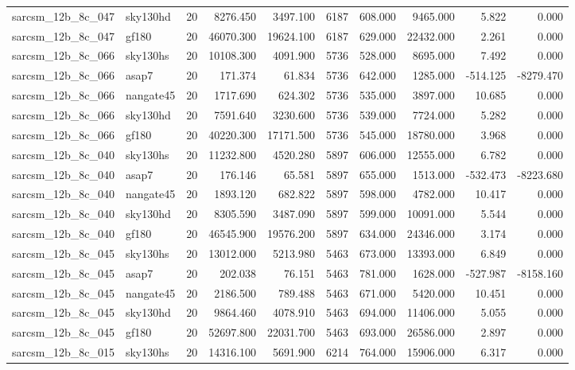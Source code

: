 \begin{longtable}{llrrrrrrrr}
sarcsm\_12b\_8c\_047 & sky130hd & 20 & 8276.450 & 3497.100 & 6187 & 608.000 & 9465.000 & 5.822 & 0.000 \\
sarcsm\_12b\_8c\_047 & gf180 & 20 & 46070.300 & 19624.100 & 6187 & 629.000 & 22432.000 & 2.261 & 0.000 \\
sarcsm\_12b\_8c\_066 & sky130hs & 20 & 10108.300 & 4091.900 & 5736 & 528.000 & 8695.000 & 7.492 & 0.000 \\
sarcsm\_12b\_8c\_066 & asap7 & 20 & 171.374 & 61.834 & 5736 & 642.000 & 1285.000 & -514.125 & -8279.470 \\
sarcsm\_12b\_8c\_066 & nangate45 & 20 & 1717.690 & 624.302 & 5736 & 535.000 & 3897.000 & 10.685 & 0.000 \\
sarcsm\_12b\_8c\_066 & sky130hd & 20 & 7591.640 & 3230.600 & 5736 & 539.000 & 7724.000 & 5.282 & 0.000 \\
sarcsm\_12b\_8c\_066 & gf180 & 20 & 40220.300 & 17171.500 & 5736 & 545.000 & 18780.000 & 3.968 & 0.000 \\
sarcsm\_12b\_8c\_040 & sky130hs & 20 & 11232.800 & 4520.280 & 5897 & 606.000 & 12555.000 & 6.782 & 0.000 \\
sarcsm\_12b\_8c\_040 & asap7 & 20 & 176.146 & 65.581 & 5897 & 655.000 & 1513.000 & -532.473 & -8223.680 \\
sarcsm\_12b\_8c\_040 & nangate45 & 20 & 1893.120 & 682.822 & 5897 & 598.000 & 4782.000 & 10.417 & 0.000 \\
sarcsm\_12b\_8c\_040 & sky130hd & 20 & 8305.590 & 3487.090 & 5897 & 599.000 & 10091.000 & 5.544 & 0.000 \\
sarcsm\_12b\_8c\_040 & gf180 & 20 & 46545.900 & 19576.200 & 5897 & 634.000 & 24346.000 & 3.174 & 0.000 \\
sarcsm\_12b\_8c\_045 & sky130hs & 20 & 13012.000 & 5213.980 & 5463 & 673.000 & 13393.000 & 6.849 & 0.000 \\
sarcsm\_12b\_8c\_045 & asap7 & 20 & 202.038 & 76.151 & 5463 & 781.000 & 1628.000 & -527.987 & -8158.160 \\
sarcsm\_12b\_8c\_045 & nangate45 & 20 & 2186.500 & 789.488 & 5463 & 671.000 & 5420.000 & 10.451 & 0.000 \\
sarcsm\_12b\_8c\_045 & sky130hd & 20 & 9864.460 & 4078.910 & 5463 & 694.000 & 11406.000 & 5.055 & 0.000 \\
sarcsm\_12b\_8c\_045 & gf180 & 20 & 52697.800 & 22031.700 & 5463 & 693.000 & 26586.000 & 2.897 & 0.000 \\
sarcsm\_12b\_8c\_015 & sky130hs & 20 & 14316.100 & 5691.900 & 6214 & 764.000 & 15906.000 & 6.317 & 0.000 \\

\end{longtable}

